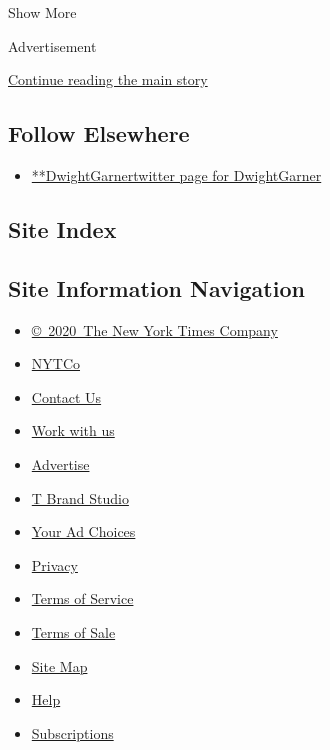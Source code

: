 Show More

Advertisement

\protect\hyperlink{after-mid2}{Continue reading the main story}

\hypertarget{follow-elsewhere}{%
\subsection{Follow Elsewhere}\label{follow-elsewhere}}

\begin{itemize}
\tightlist
\item
  \href{https://twitter.com/DwightGarner}{**DwightGarnertwitter page for
  DwightGarner}
\end{itemize}

\hypertarget{site-index}{%
\subsection{Site Index}\label{site-index}}

\hypertarget{site-information-navigation}{%
\subsection{Site Information
Navigation}\label{site-information-navigation}}

\begin{itemize}
\tightlist
\item
  \href{https://help.nytimes.com/hc/en-us/articles/115014792127-Copyright-notice}{©~2020~The
  New York Times Company}
\end{itemize}

\begin{itemize}
\tightlist
\item
  \href{https://www.nytco.com/}{NYTCo}
\item
  \href{https://help.nytimes.com/hc/en-us/articles/115015385887-Contact-Us}{Contact
  Us}
\item
  \href{https://www.nytco.com/careers/}{Work with us}
\item
  \href{https://nytmediakit.com/}{Advertise}
\item
  \href{http://www.tbrandstudio.com/}{T Brand Studio}
\item
  \href{https://www.nytimes.com/privacy/cookie-policy\#how-do-i-manage-trackers}{Your
  Ad Choices}
\item
  \href{https://www.nytimes.com/privacy}{Privacy}
\item
  \href{https://help.nytimes.com/hc/en-us/articles/115014893428-Terms-of-service}{Terms
  of Service}
\item
  \href{https://help.nytimes.com/hc/en-us/articles/115014893968-Terms-of-sale}{Terms
  of Sale}
\item
  \href{https://spiderbites.nytimes.com}{Site Map}
\item
  \href{https://help.nytimes.com/hc/en-us}{Help}
\item
  \href{https://www.nytimes.com/subscription?campaignId=37WXW}{Subscriptions}
\end{itemize}
